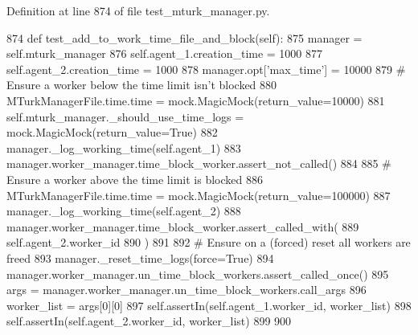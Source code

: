 Definition at line 874 of file test\+\_\+mturk\+\_\+manager.\+py.


\begin{DoxyCode}
874     \textcolor{keyword}{def }test\_add\_to\_work\_time\_file\_and\_block(self):
875         manager = self.mturk\_manager
876         self.agent\_1.creation\_time = 1000
877         self.agent\_2.creation\_time = 1000
878         manager.opt[\textcolor{stringliteral}{'max\_time'}] = 10000
879         \textcolor{comment}{# Ensure a worker below the time limit isn't blocked}
880         MTurkManagerFile.time.time = mock.MagicMock(return\_value=10000)
881         self.mturk\_manager.\_should\_use\_time\_logs = mock.MagicMock(return\_value=\textcolor{keyword}{True})
882         manager.\_log\_working\_time(self.agent\_1)
883         manager.worker\_manager.time\_block\_worker.assert\_not\_called()
884 
885         \textcolor{comment}{# Ensure a worker above the time limit is blocked}
886         MTurkManagerFile.time.time = mock.MagicMock(return\_value=100000)
887         manager.\_log\_working\_time(self.agent\_2)
888         manager.worker\_manager.time\_block\_worker.assert\_called\_with(
889             self.agent\_2.worker\_id
890         )
891 
892         \textcolor{comment}{# Ensure on a (forced) reset all workers are freed}
893         manager.\_reset\_time\_logs(force=\textcolor{keyword}{True})
894         manager.worker\_manager.un\_time\_block\_workers.assert\_called\_once()
895         args = manager.worker\_manager.un\_time\_block\_workers.call\_args
896         worker\_list = args[0][0]
897         self.assertIn(self.agent\_1.worker\_id, worker\_list)
898         self.assertIn(self.agent\_2.worker\_id, worker\_list)
899 
900 
\end{DoxyCode}
\mbox{\label{classparlai_1_1mturk_1_1core_1_1dev_1_1test_1_1test__mturk__manager_1_1TestMTurkManagerTimeHandling_a3f09b888f15154ea89d22f96f66f666b}} 

